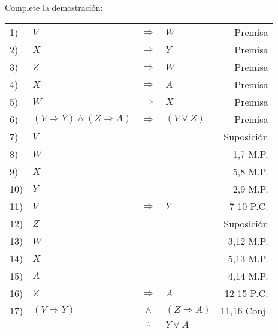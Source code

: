 \documentclass[12pt]{report}
\theoremstyle{largebreak}
\begin{document}
    \begin{excer}
        Complete la demostración:
        \begin{center}
            \begin{tabular}{l l c l r}
                1) & $V$ & $\Rightarrow$ & $W$ & Premisa \\
                2) & $X$ & $\Rightarrow$ & $Y$ & Premisa \\
                3) & $Z$ & $\Rightarrow$ & $W$ & Premisa \\
                4) & $X$ & $\Rightarrow$ & $A$ & Premisa \\
                5) & $W$ & $\Rightarrow$ & $X$ & Premisa \\
                6) & $(V\Rightarrow Y)\land(Z\Rightarrow A)$ & $\Rightarrow$ & $(V\lor Z)$ & Premisa \\
                7) & $V$ &  &  & Suposición \\
                8) & $W$ &  &  & 1,7 M.P. \\
                9) & $X$ &  &  & 5,8 M.P. \\
                10) & $Y$ &  &  & 2,9 M.P. \\
                11) & $V$ & $\Rightarrow$ & $Y$ & 7-10 P.C. \\
                12) & $Z$ &  &  & Suposición \\
                13) & $W$ &  &  & 3,12 M.P. \\
                14) & $X$ &  &  & 5,13 M.P. \\
                15) & $A$ &  &  & 4,14 M.P. \\
                16) & $Z$ & $\Rightarrow$ & $A$ & 12-15 P.C. \\
                17) & $(V\Rightarrow Y)$ & $\land$ & $(Z\Rightarrow A)$ & 11,16 Conj. \\
                \hline
                & & $\therefore$ & $Y\lor A$ & \\
            \end{tabular}
        \end{center}

    \end{excer}
\end{document}
